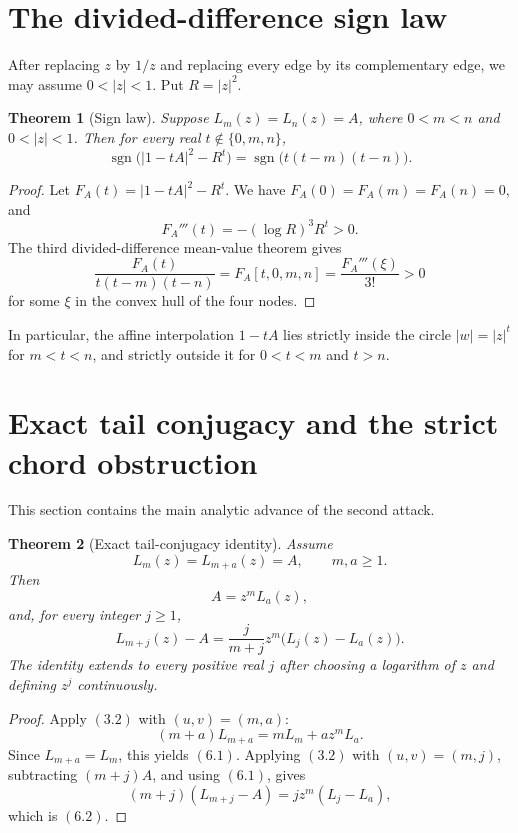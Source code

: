 \documentclass[11pt]{article}
\newtheorem{theorem}{Theorem}[section]
\theoremstyle{definition}
\begin{document}
\section{The divided-difference sign law}

After replacing \(z\) by \(1/z\) and replacing every edge by its complementary
edge, we may assume \(0<|z|<1\).  Put \(R=|z|^2\).

\begin{theorem}[Sign law]\label{thm:sign}
Suppose \(L_m(z)=L_n(z)=A\), where \(0<m<n\) and \(0<|z|<1\).  Then for every
real \(t\notin\{0,m,n\}\),
\[
 \operatorname{sgn}\bigl(|1-tA|^2-R^t\bigr)
 =\operatorname{sgn}\bigl(t(t-m)(t-n)\bigr).
 \tag{5.1}
\]
\end{theorem}

\begin{proof}
Let \(F_A(t)=|1-tA|^2-R^t\).  We have
\(F_A(0)=F_A(m)=F_A(n)=0\), and
\[
 F_A'''(t)=-(\log R)^3R^t>0.
\]
The third divided-difference mean-value theorem gives
\[
 \frac{F_A(t)}{t(t-m)(t-n)}
 =F_A[t,0,m,n]=\frac{F_A'''(\xi)}{3!}>0
\]
for some \(\xi\) in the convex hull of the four nodes.
\end{proof}

In particular, the affine interpolation \(1-tA\) lies strictly inside the
circle \(|w|=|z|^t\) for \(m<t<n\), and strictly outside it for
\(0<t<m\) and \(t>n\).

\section{Exact tail conjugacy and the strict chord obstruction}
\label{sec:tail}

This section contains the main analytic advance of the second attack.

\begin{theorem}[Exact tail-conjugacy identity]\label{thm:tail}
Assume
\[
 L_m(z)=L_{m+a}(z)=A,
 \qquad m,a\geq1.
\]
Then
\begin{equation}
 A=z^mL_a(z),
 \tag{6.1}
\end{equation}
and, for every integer \(j\geq1\),
\begin{equation}
 L_{m+j}(z)-A
 =\frac{j}{m+j}z^m\bigl(L_j(z)-L_a(z)\bigr).
 \tag{6.2}
\end{equation}
The identity extends to every positive real \(j\) after choosing a logarithm
of \(z\) and defining \(z^j\) continuously.
\end{theorem}

\begin{proof}
Apply \((3.2)\) with \((u,v)=(m,a)\):
\[
 (m+a)L_{m+a}=mL_m+az^mL_a.
\]
Since \(L_{m+a}=L_m\), this yields \((6.1)\).  Applying \((3.2)\) with
\((u,v)=(m,j)\), subtracting \((m+j)A\), and using \((6.1)\), gives
\[
 (m+j)(L_{m+j}-A)=jz^m(L_j-L_a),
\]
which is \((6.2)\).
\end{proof}
\end{document}

